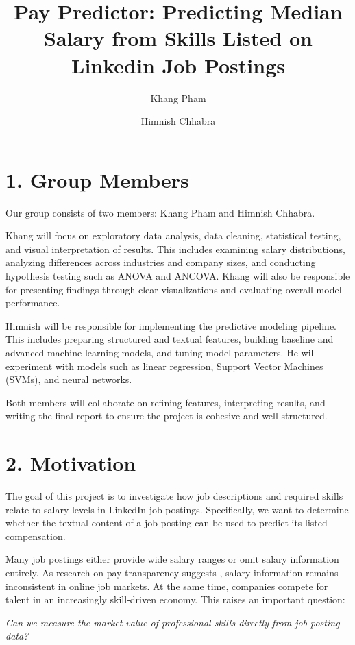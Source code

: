 \documentclass[11pt]{article}
\title{Pay Predictor: Predicting Median Salary from Skills Listed on Linkedin Job Postings}
\author{Khang Pham \and Himnish Chhabra \\
}
\begin{document}
\maketitle

\section*{1. Group Members}

Our group consists of two members: Khang Pham and Himnish Chhabra.

Khang will focus on exploratory data analysis, data cleaning, statistical testing, and visual interpretation of results. This includes examining salary distributions, analyzing differences across industries and company sizes, and conducting hypothesis testing such as ANOVA and ANCOVA. Khang will also be responsible for presenting findings through clear visualizations and evaluating overall model performance.

Himnish will be responsible for implementing the predictive modeling pipeline. This includes preparing structured and textual features, building baseline and advanced machine learning models, and tuning model parameters. He will experiment with models such as linear regression, Support Vector Machines (SVMs), and neural networks.

Both members will collaborate on refining features, interpreting results, and writing the final report to ensure the project is cohesive and well-structured.

\section*{2. Motivation}

The goal of this project is to investigate how job descriptions and required skills relate to salary levels in LinkedIn job postings. Specifically, we want to determine whether the textual content of a job posting can be used to predict its listed compensation.

Many job postings either provide wide salary ranges or omit salary information entirely. As research on pay transparency suggests \cite{arnold2025}, salary information remains inconsistent in online job markets. At the same time, companies compete for talent in an increasingly skill-driven economy. This raises an important question:

\begin{center}
\textit{Can we measure the market value of professional skills directly from job posting data?}
\end{center}
\end{document}
